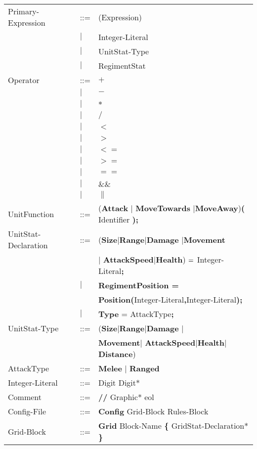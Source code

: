 \begin{center}
\begin{longtable}{ l l l }
		Primary-Expression			&	::=	&(Expression)\\
									&$\mid$	&Integer-Literal \\
									&$\mid$	&UnitStat-Type\\
									&$\mid$	&RegimentStat \\	
		Operator					&	::=	&$\boldsymbol {+}$\\
									&$\mid$	&$\boldsymbol {-}$\\
									&$\mid$	&$\boldsymbol {*}$\\
									&$\mid$	&$\boldsymbol {/}$\\
									&$\mid$	&$\boldsymbol {<}$\\
									&$\mid$	&$\boldsymbol {>}$\\
									&$\mid$	&$\boldsymbol {<=}$\\
									&$\mid$	&$\boldsymbol {>=}$\\
									&$\mid$	&$\boldsymbol {==}$\\
									&$\mid$	&$\boldsymbol {\&\&}$\\
									&$\mid$	&$\boldsymbol {\|}$\\
		UnitFunction				&	::=	&({\bf Attack} $\mid$ {\bf MoveTowards} $\mid${\bf MoveAway}){\bf (} Identifier {\bf );}\\
		UnitStat-Declaration		&	::=	&({\bf Size}$\mid${\bf Range}$\mid${\bf Damage} $\mid${\bf Movement}\\ 
									&		&$\mid$ {\bf AttackSpeed}$\mid${\bf Health}) ${\bf = }$ Integer-Literal{\bf ;} \\
									&$\mid$	&{\bf RegimentPosition =} \\
									&		&{\bf Position(}Integer-Literal{\bf ,}Integer-Literal{\bf );}\\
									&$\mid$	&{\bf Type} = AttackType{\bf ;}\\
		UnitStat-Type				&	::=	&({\bf Size}$\mid${\bf Range}$\mid${\bf Damage} $\mid$\\
									&		&{\bf Movement}$\mid$ {\bf AttackSpeed}$\mid${\bf Health}$\mid${\bf Distance})\\ 
		AttackType					&	::=	&{\bf Melee} $\mid$ {\bf Ranged} \\
		Integer-Literal				&	::=	&Digit Digit*\\
		Comment						&	::=	&{\bf //} Graphic* eol\\
		Config-File					&	::=	&{\bf Config} Grid-Block Rules-Block  		\\
		Grid-Block					&	::=	&{\bf Grid} Block-Name	 {\bf \{} GridStat-Declaration* \bf{\}} \\

\end{longtable}
\end{center}
